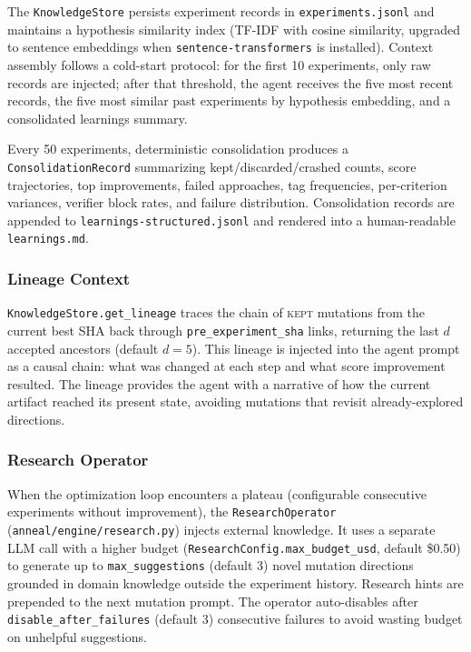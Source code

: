 The \texttt{KnowledgeStore} persists experiment records in \texttt{experiments.jsonl} and maintains a hypothesis similarity index (TF-IDF with cosine similarity, upgraded to sentence embeddings when \texttt{sentence-transformers} is installed).
Context assembly follows a cold-start protocol: for the first 10 experiments, only raw records are injected; after that threshold, the agent receives the five most recent records, the five most similar past experiments by hypothesis embedding, and a consolidated learnings summary.

Every 50 experiments, deterministic consolidation produces a \texttt{ConsolidationRecord} summarizing kept/discarded/crashed counts, score trajectories, top improvements, failed approaches, tag frequencies, per-criterion variances, verifier block rates, and failure distribution.
Consolidation records are appended to \texttt{learnings-structured.jsonl} and rendered into a human-readable \texttt{learnings.md}.

\subsubsection{Lineage Context}\label{sec:lineage}

\texttt{KnowledgeStore.get\_lineage} traces the chain of \textsc{kept} mutations from the current best SHA back through \texttt{pre\_experiment\_sha} links, returning the last $d$ accepted ancestors (default $d = 5$).
This lineage is injected into the agent prompt as a causal chain: what was changed at each step and what score improvement resulted.
The lineage provides the agent with a narrative of how the current artifact reached its present state, avoiding mutations that revisit already-explored directions.

\subsubsection{Research Operator}\label{sec:research-operator}

When the optimization loop encounters a plateau (configurable consecutive experiments without improvement), the \texttt{ResearchOperator} (\texttt{anneal/engine/research.py}) injects external knowledge.
It uses a separate LLM call with a higher budget (\texttt{ResearchConfig.max\_budget\_usd}, default \$0.50) to generate up to \texttt{max\_suggestions} (default 3) novel mutation directions grounded in domain knowledge outside the experiment history.
Research hints are prepended to the next mutation prompt.
The operator auto-disables after \texttt{disable\_after\_failures} (default 3) consecutive failures to avoid wasting budget on unhelpful suggestions.

